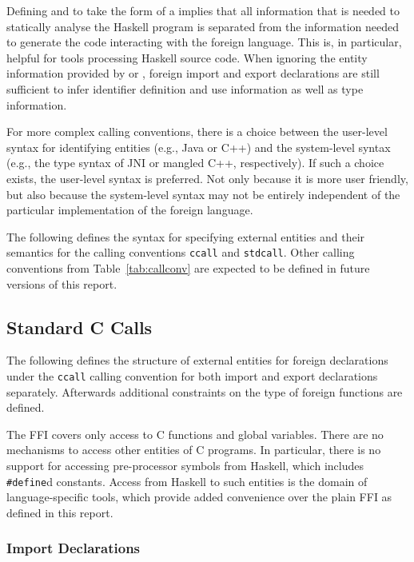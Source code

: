 \documentclass[a4paper,twoside]{article}
\newcommand{\code}[1]{\texttt{#1}}      %
\begin{document}
Defining  and  to take the form of a
 implies that all information that is needed to statically
analyse the Haskell program is separated from the information needed to
generate the code interacting with the foreign language.  This is, in
particular, helpful for tools processing Haskell source code.  When ignoring
the entity information provided by  or , foreign
import and export declarations are still sufficient to infer identifier
definition and use information as well as type information.

For more complex calling conventions, there is a choice between the user-level
syntax for identifying entities (e.g., Java or C{+}{+}) and the system-level
syntax (e.g., the type syntax of JNI or mangled C{+}{+}, respectively).  If
such a choice exists, the user-level syntax is preferred.  Not only because it
is more user friendly, but also because the system-level syntax may not be
entirely independent of the particular implementation of the foreign language.

The following defines the syntax for specifying external entities and their
semantics for the calling conventions \code{ccall} and \code{stdcall}.  Other
calling conventions from Table~\ref{tab:callconv} are expected to be defined
in future versions of this report.


\subsection{Standard C Calls}
\label{sec:ccall}

The following defines the structure of external entities for foreign
declarations under the \code{ccall} calling convention for both import and
export declarations separately.  Afterwards additional constraints on the type
of foreign functions are defined.

The FFI covers only access to C functions and global variables.  There are no
mechanisms to access other entities of C programs.  In particular, there is no
support for accessing pre-processor symbols from Haskell, which includes
\code{\#define}d constants.  Access from Haskell to such entities is the
domain of language-specific tools, which provide added convenience over the
plain FFI as defined in this report.

\subsubsection{Import Declarations}
\end{document}
